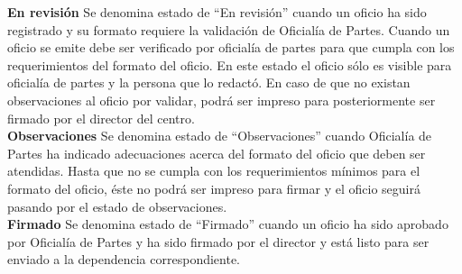 \textbf{En revisión}
Se denomina estado de “En revisión” cuando un oficio ha sido registrado y su formato requiere la validación de Oficialía de Partes. Cuando un oficio se emite debe ser verificado por oficialía de partes para que cumpla con los requerimientos del formato del oficio. En este estado el oficio sólo es visible para oficialía de partes y la persona que lo redactó. En caso de que no existan observaciones al oficio por validar, podrá ser impreso para posteriormente ser firmado por el director del centro.\\

\textbf{Observaciones}
Se denomina estado de “Observaciones” cuando Oficialía de Partes ha indicado adecuaciones acerca del formato del oficio que deben ser atendidas. Hasta que no se cumpla con los requerimientos mínimos para el formato del oficio, éste no podrá ser impreso para firmar y el oficio seguirá pasando por el estado de observaciones.\\

\textbf{Firmado}
Se denomina estado de “Firmado” cuando un oficio ha sido aprobado por Oficialía de Partes y ha sido firmado por el director y está listo para ser enviado a la dependencia correspondiente.\\